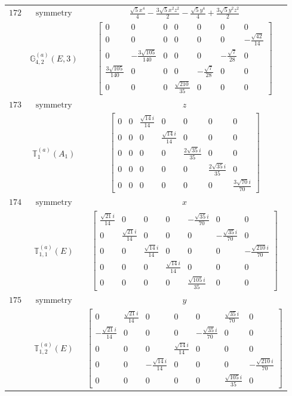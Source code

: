 \documentclass[fleqn,8pt,landscape]{jsarticle}
\begin{document}
\begin{longtable}{ccc}
$ 172 $ & $ \text{symmetry} $ & $ \frac{\sqrt{5} x^{4}}{4} - \frac{3 \sqrt{5} x^{2} z^{2}}{2} - \frac{\sqrt{5} y^{4}}{4} + \frac{3 \sqrt{5} y^{2} z^{2}}{2} $ \\
$  $ & $ \mathbb{G}_{4,2}^{(a)}(E,3) $ & $ \begin{bmatrix} 0 & 0 & 0 & 0 & 0 & 0 & 0 \\ 0 & 0 & 0 & 0 & 0 & 0 & - \frac{\sqrt{42}}{14} \\ 0 & - \frac{3 \sqrt{105}}{140} & 0 & 0 & 0 & - \frac{\sqrt{7}}{28} & 0 \\ \frac{3 \sqrt{105}}{140} & 0 & 0 & 0 & - \frac{\sqrt{7}}{28} & 0 & 0 \\ 0 & 0 & 0 & \frac{\sqrt{210}}{35} & 0 & 0 & 0 \end{bmatrix} $ \\ \hline
$ 173 $ & $ \text{symmetry} $ & $ z $ \\
$  $ & $ \mathbb{T}_{1}^{(a)}(A_{1}) $ & $ \begin{bmatrix} 0 & 0 & \frac{\sqrt{14} i}{14} & 0 & 0 & 0 & 0 \\ 0 & 0 & 0 & \frac{\sqrt{14} i}{14} & 0 & 0 & 0 \\ 0 & 0 & 0 & 0 & \frac{2 \sqrt{35} i}{35} & 0 & 0 \\ 0 & 0 & 0 & 0 & 0 & \frac{2 \sqrt{35} i}{35} & 0 \\ 0 & 0 & 0 & 0 & 0 & 0 & \frac{3 \sqrt{70} i}{70} \end{bmatrix} $ \\ \hline
$ 174 $ & $ \text{symmetry} $ & $ x $ \\
$  $ & $ \mathbb{T}_{1,1}^{(a)}(E) $ & $ \begin{bmatrix} \frac{\sqrt{21} i}{14} & 0 & 0 & 0 & - \frac{\sqrt{35} i}{70} & 0 & 0 \\ 0 & \frac{\sqrt{21} i}{14} & 0 & 0 & 0 & - \frac{\sqrt{35} i}{70} & 0 \\ 0 & 0 & \frac{\sqrt{14} i}{14} & 0 & 0 & 0 & - \frac{\sqrt{210} i}{70} \\ 0 & 0 & 0 & \frac{\sqrt{14} i}{14} & 0 & 0 & 0 \\ 0 & 0 & 0 & 0 & \frac{\sqrt{105} i}{35} & 0 & 0 \end{bmatrix} $ \\ \hline
$ 175 $ & $ \text{symmetry} $ & $ y $ \\
$  $ & $ \mathbb{T}_{1,2}^{(a)}(E) $ & $ \begin{bmatrix} 0 & \frac{\sqrt{21} i}{14} & 0 & 0 & 0 & \frac{\sqrt{35} i}{70} & 0 \\ - \frac{\sqrt{21} i}{14} & 0 & 0 & 0 & - \frac{\sqrt{35} i}{70} & 0 & 0 \\ 0 & 0 & 0 & \frac{\sqrt{14} i}{14} & 0 & 0 & 0 \\ 0 & 0 & - \frac{\sqrt{14} i}{14} & 0 & 0 & 0 & - \frac{\sqrt{210} i}{70} \\ 0 & 0 & 0 & 0 & 0 & \frac{\sqrt{105} i}{35} & 0 \end{bmatrix} $ \\ \hline

\end{longtable}
\end{document}
